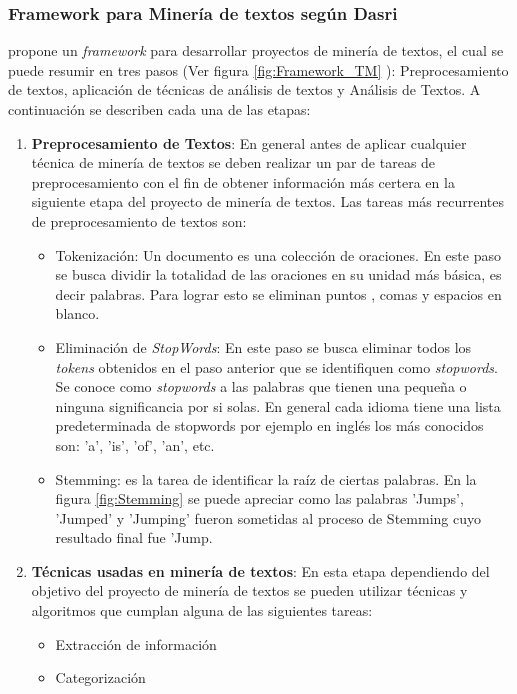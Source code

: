 \subsubsection{Framework para Minería de textos según Dasri}
    \cite{dasritext} propone un \textit{framework} para desarrollar proyectos de minería de textos, el cual se puede resumir en tres pasos (Ver figura \ref{fig:Framework_TM} ): Preprocesamiento de textos, aplicación de técnicas de análisis de textos y Análisis de Textos. A continuación se describen cada una de las etapas:
    \begin{enumerate}
        \item \textbf{Preprocesamiento de Textos}: En general antes de aplicar cualquier técnica de minería de textos se deben realizar un par de tareas de preprocesamiento con el fin de obtener información más certera en la siguiente etapa del proyecto de minería de textos. Las tareas más recurrentes de preprocesamiento de textos son:
        \begin{itemize}
            \item Tokenización: Un documento es una colección de oraciones. En este paso se busca dividir la totalidad de las oraciones en su unidad más básica, es decir palabras. Para lograr esto se eliminan puntos , comas y espacios en blanco.
            \item Eliminación de \textit{StopWords}: En este paso se busca eliminar todos los \textit{tokens} obtenidos en el paso anterior que se identifiquen como \textit{stopwords}. Se conoce como \textit{stopwords} a las palabras que tienen una pequeña o ninguna significancia por si solas. En general cada idioma tiene una lista predeterminada de stopwords por ejemplo en inglés los más conocidos son: 'a’, 'is’, 'of’, 'an’, etc.
            \item Stemming: es la tarea de identificar la raíz de ciertas palabras. En la figura \ref{fig:Stemming} se puede apreciar como las palabras 'Jumps', 'Jumped' y 'Jumping' fueron sometidas al proceso de Stemming cuyo resultado final fue 'Jump.
        \end{itemize}
    \item \textbf{Técnicas usadas en minería de textos}: En esta etapa dependiendo del objetivo del proyecto de minería de textos se pueden utilizar técnicas y algoritmos que cumplan alguna de las siguientes tareas:
        \begin{itemize}
            \item Extracción de información
            \item Categorización

\end{itemize}
\end{enumerate}

